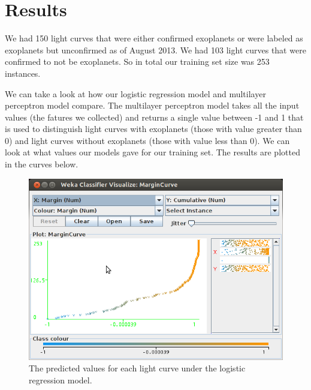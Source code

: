\documentclass{amsart}
\begin{document}
\section{Results}
We had 150 light curves that were either confirmed exoplanets or were labeled as exoplanets but unconfirmed as of August 2013. We had 103 light curves that were confirmed to not be exoplanets. So in total our training set size was 253 instances. 





We can take a look at how our logistic regression model and multilayer perceptron model compare. The multilayer perceptron model takes all the input values (the fatures we collected) and returns a single value between -1 and 1 that is used to distinguish light curves with exoplanets (those with value greater than 0) and light curves without exoplanets (those with value less than 0). We can look at what values our models gave for our training set. The results are plotted in the curves below.
	\begin{figure}
	\centering
	\label{logistic}
	\includegraphics[width=6in]{logistic_regression}
	\caption{The predicted values for each light curve under the logistic regression model.}
	\end{figure}
\end{document}

